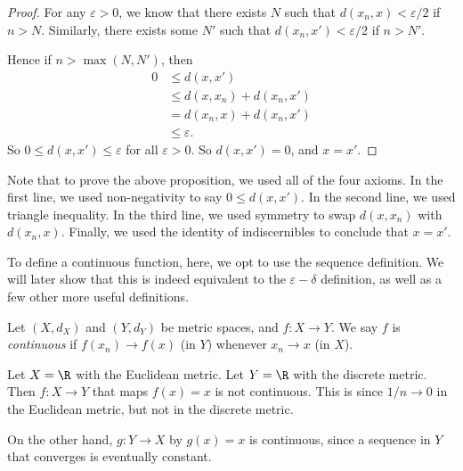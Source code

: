 \documentclass[a4paper]{article}
\begin{document}
\begin{proof}
  For any $\varepsilon > 0$, we know that there exists $N$ such that $d(x_n, x) < \varepsilon/2$ if $n > N$. Similarly, there exists some $N'$ such that $d(x_n, x') < \varepsilon/2$ if $n > N'$.

  Hence if $n > \max(N, N')$, then
  \begin{align*}
    0 &\leq d(x, x')\\
    &\leq d(x, x_n) + d(x_n, x')\\
    &= d(x_n, x) + d(x_n, x')\\
    &\leq \varepsilon.
  \end{align*}
  So $0 \leq d(x, x') \leq \varepsilon$ for all $\varepsilon > 0$. So $d(x, x') = 0$, and $x = x'$.
\end{proof}

Note that to prove the above proposition, we used all of the four axioms. In the first line, we used non-negativity to say $0\leq d(x, x')$. In the second line, we used triangle inequality. In the third line, we used symmetry to swap $d(x, x_n)$ with $d(x_n, x)$. Finally, we used the identity of indiscernibles to conclude that $x = x'$.

To define a continuous function, here, we opt to use the sequence definition. We will later show that this is indeed equivalent to the $\varepsilon-\delta$ definition, as well as a few other more useful definitions.
\begin{defi}
  Let $(X, d_X)$ and $(Y, d_Y)$ be metric spaces, and $f:X \to Y$. We say $f$ is \emph{continuous} if $f(x_n) \to f(x)$ (in $Y$) whenever $x_n \to x$ (in $X$).
\end{defi}

\begin{eg}
  Let $X = \R$ with the Euclidean metric. Let $Y = \R$ with the discrete metric. Then
  $f:X \to Y$ that maps $f(x) = x$ is not continuous. This is since $1/n \to 0$ in the Euclidean metric, but not in the discrete metric.

  On the other hand, $g: Y\to X$ by $g(x) = x$ is continuous, since a sequence in $Y$ that converges is eventually constant.
\end{eg}
\end{document}
